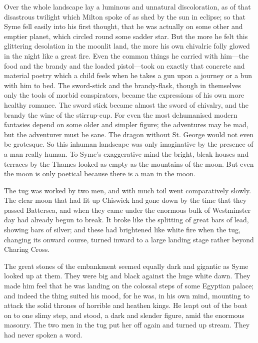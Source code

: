 \documentclass{book}
\begin{document}
Over the whole landscape lay a luminous and unnatural discoloration, as of that disastrous twilight which Milton spoke of as shed by the sun in eclipse; so that Syme fell easily into his first thought, that he was actually on some other and emptier planet, which circled round some sadder star. But the more he felt this glittering desolation in the moonlit land, the more his own chivalric folly glowed in the night like a great fire. Even the common things he carried with him—the food and the brandy and the loaded pistol—took on exactly that concrete and material poetry which a child feels when he takes a gun upon a journey or a bun with him to bed. The sword-stick and the brandy-flask, though in themselves only the tools of morbid conspirators, became the expressions of his own more healthy romance. The sword stick became almost the sword of chivalry, and the brandy the wine of the stirrup-cup. For even the most dehumanised modern fantasies depend on some older and simpler figure; the adventures may be mad, but the adventurer must be sane. The dragon without St. George would not even be grotesque. So this inhuman landscape was only imaginative by the presence of a man really human. To Syme’s exaggerative mind the bright, bleak houses and terraces by the Thames looked as empty as the mountains of the moon. But even the moon is only poetical because there is a man in the moon.

The tug was worked by two men, and with much toil went comparatively slowly. The clear moon that had lit up Chiswick had gone down by the time that they passed Battersea, and when they came under the enormous bulk of Westminster day had already begun to break. It broke like the splitting of great bars of lead, showing bars of silver; and these had brightened like white fire when the tug, changing its onward course, turned inward to a large landing stage rather beyond Charing Cross.

The great stones of the embankment seemed equally dark and gigantic as Syme looked up at them. They were big and black against the huge white dawn. They made him feel that he was landing on the colossal steps of some Egyptian palace; and indeed the thing suited his mood, for he was, in his own mind, mounting to attack the solid thrones of horrible and heathen kings. He leapt out of the boat on to one slimy step, and stood, a dark and slender figure, amid the enormous masonry. The two men in the tug put her off again and turned up stream. They had never spoken a word.
\end{document}
